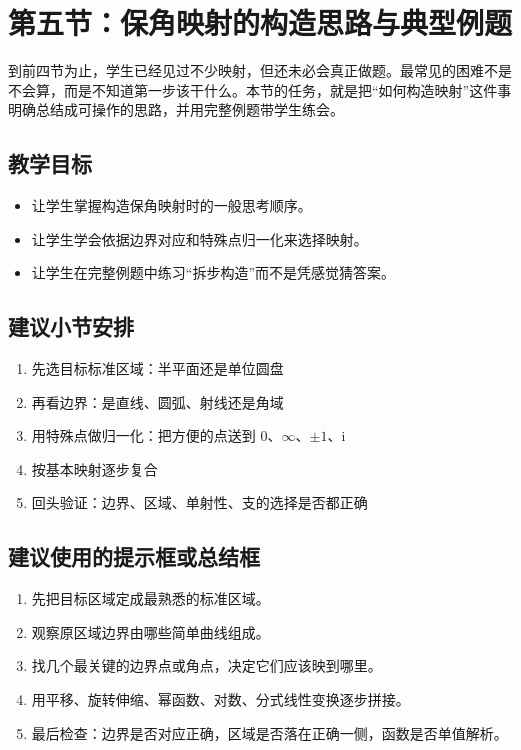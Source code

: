 \section{第五节：保角映射的构造思路与典型例题}

\begin{wulibj}[本节要解决的问题]
到前四节为止，学生已经见过不少映射，但还未必会真正做题。最常见的困难不是不会算，而是不知道第一步该干什么。本节的任务，就是把``如何构造映射''这件事明确总结成可操作的思路，并用完整例题带学生练会。
\end{wulibj}

\subsection*{教学目标}
\begin{itemize}
    \item 让学生掌握构造保角映射时的一般思考顺序。
    \item 让学生学会依据边界对应和特殊点归一化来选择映射。
    \item 让学生在完整例题中练习``拆步构造''而不是凭感觉猜答案。
\end{itemize}

\subsection*{建议小节安排}
\begin{enumerate}
    \item 先选目标标准区域：半平面还是单位圆盘
    \item 再看边界：是直线、圆弧、射线还是角域
    \item 用特殊点做归一化：把方便的点送到 $0$、$\infty$、$\pm 1$、$\mathrm{i}$
    \item 按基本映射逐步复合
    \item 回头验证：边界、区域、单射性、支的选择是否都正确
\end{enumerate}

\subsection*{建议使用的提示框或总结框}
\begin{tishi}[构造保角映射时的五步法]
\begin{enumerate}
    \item 先把目标区域定成最熟悉的标准区域。
    \item 观察原区域边界由哪些简单曲线组成。
    \item 找几个最关键的边界点或角点，决定它们应该映到哪里。
    \item 用平移、旋转伸缩、幂函数、对数、分式线性变换逐步拼接。
    \item 最后检查：边界是否对应正确，区域是否落在正确一侧，函数是否单值解析。
\end{enumerate}
\end{tishi}

